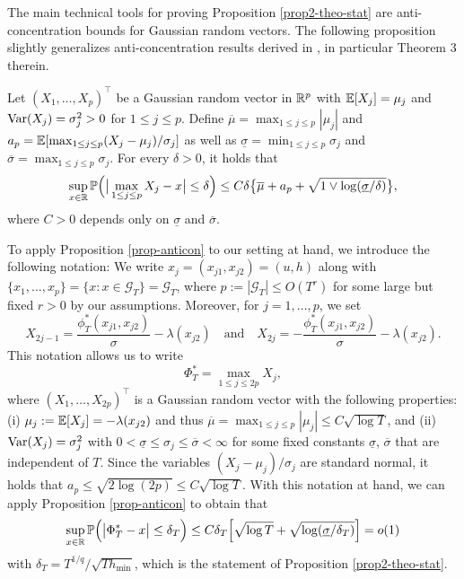 \documentclass[a4paper,12pt]{article}
\numberwithin{equation}{section}
\begin{document}
The main technical tools for proving Proposition \ref{prop2-theo-stat} are anti-concentration bounds for Gaussian random vectors. The following proposition slightly generalizes anti-concentration results derived in \cite{Chernozhukov2015}, in particular Theorem 3 therein. 
\begin{propA}\label{prop-anticon}
Let $(X_1,\ldots,X_p)^\top$ be a Gaussian random vector in $\mathbb{R}^p$ with $\mathbb{E}[X_j] = \mu_j$ and $\textnormal{Var}(X_j) = \sigma_j^2 > 0$ for $1 \le j \le p$. Define $\overline{\mu} = \max_{1 \le j \le p} |\mu_j|$ and $a_p = \mathbb{E}[ \max_{1 \le j \le p} (X_j-\mu_j)/\sigma_j ]$ as well as $\underline{\sigma} = \min_{1 \le j \le p} \sigma_j$ and $\overline{\sigma} = \max_{1 \le j \le p} \sigma_j$. For every $\delta > 0$, it holds that
\[ \sup_{x \in \mathbb{R}} \mathbb{P} \Big( \big| \max_{1 \le j \le p} X_j - x \big| \le \delta \Big) \le C \delta \big\{ \overline{\mu} + a_p + \sqrt{1 \vee \log(\underline{\sigma}/\delta)} \big\}, \]
where $C > 0$ depends only on $\underline{\sigma}$ and $\overline{\sigma}$. 
\end{propA} 
To apply Proposition \ref{prop-anticon} to our setting at hand, we introduce the following notation: We write $x_j =(x_{j1},x_{j2}) = (u,h)$ along with $\{x_1,\ldots,x_p\} = \{ x : x \in \mathcal{G}_T \} = \mathcal{G}_T$, where $p := |\mathcal{G}_T| \le O(T^r)$ for some large but fixed $r > 0$ by our assumptions. Moreover, for $j = 1,\ldots,p$, we set 
\[ X_{2j-1} = \frac{\phi_T^*(x_{j1},x_{j2})}{\sigma} - \lambda(x_{j2}) \quad \text{and} \quad X_{2j} = -\frac{\phi_T^*(x_{j1},x_{j2})}{\sigma} - \lambda(x_{j2}). \]
This notation allows us to write
\[ \Phi_T^* = \max_{1 \le j \le 2p} X_j, \]
where $(X_1,\ldots,X_{2p})^\top$ is a Gaussian random vector with the following properties: (i) $\mu_j := \mathbb{E}[X_j] = - \lambda(x_{j2})$ and thus $\overline{\mu} = \max_{1 \le j \le p} |\mu_j| \le C \sqrt{\log T}$, and (ii) $\textnormal{Var}(X_j) = \sigma_j^2$ with $0 < \underline{\sigma} \le \sigma_j \le \overline{\sigma} < \infty$ for some fixed constants $\underline{\sigma}$, $\overline{\sigma}$ that are independent of $T$. Since the variables $(X_j - \mu_j)/\sigma_j$ are standard normal, it holds that $a_p \le \sqrt{2 \log (2p)} \le C \sqrt{\log T}$. With this notation at hand, we can apply Proposition \ref{prop-anticon} to obtain that 
\[ \sup_{x \in \mathbb{R}} \mathbb{P} \Big( \big| \Phi_T^* - x \big| \le \delta_T \Big) \le C \delta_T \Big[ \sqrt{\log T} + \sqrt{ \log(\underline{\sigma}/\delta_T) } \Big] = o(1) \]
with $\delta_T = T^{1/q} / \sqrt{T h_{\min}}$, which is the statement of Proposition \ref{prop2-theo-stat}.
\end{document}
